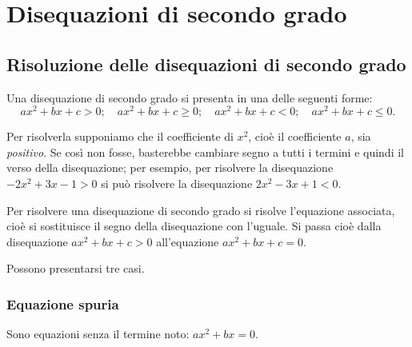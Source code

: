 \chapter{Disequazioni di secondo grado}

\section{Risoluzione delle disequazioni di secondo grado}

Una disequazione di secondo grado si presenta in una delle seguenti forme:
\[ax^2+bx+c>0;\quad ax^2+bx+c\ge 0;\quad ax^2+bx+c<0;\quad ax^2+bx+c\le 0.\]

Per risolverla supponiamo che il coefficiente di $x^2$, cioè il coefficiente $a$, sia \textit{positivo}. Se così non fosse, basterebbe cambiare segno a tutti i termini e quindi il verso della disequazione; per esempio, per risolvere la disequazione $-2x^2+3x-1>0$ si può risolvere la disequazione $2x^2-3x+1<0$.

Per risolvere una disequazione di secondo grado si risolve l'equazione associata, cioè si sostituisce il segno della disequazione con l'uguale. Si passa cioè dalla disequazione $ax^2+bx+c>0$ all'equazione $ax^2+bx+c=0$.

Possono presentarsi tre casi.

\subsection{Equazione spuria}
Sono equazioni senza il termine noto: $ax^2+bx=0$.

